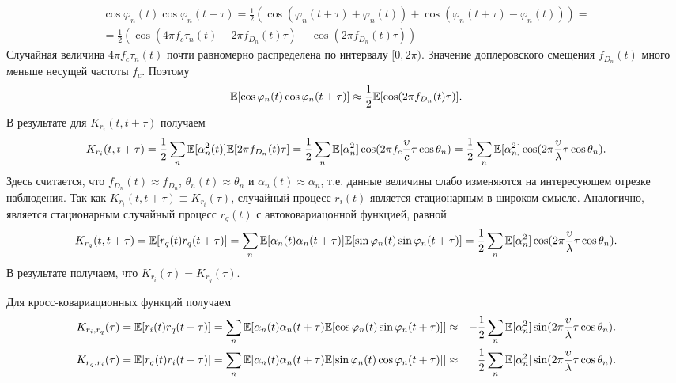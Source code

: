 \documentclass{book}
\numberwithin{theorem}{chapter}
\numberwithin{statement}{chapter}
\numberwithin{lemma}{chapter}
\theoremstyle{definition}
\numberwithin{task}{chapter}
\theoremstyle{remark}
\numberwithin{example}{chapter}
\theoremstyle{definition}
\numberwithin{definition}{chapter}
\theoremstyle{remark}
\theoremstyle{remark}
\numberwithin{lyrics}{section}
\begin{document}
\begin{gather*}
\cos \varphi_n(t) \cos \varphi_n(t + \tau) = \frac{1}{2}(\cos(\varphi_n(t + \tau) + \varphi_n(t)) 
+ \cos(\varphi_n(t + \tau) - \varphi_n(t))) = \\ = \frac{1}{2}(\cos(4 \pi f_c \tau_n(t) - 2\pi f_{D_n}(t) \tau) + \cos(2\pi f_{D_n}(t) \tau)) 
\end{gather*}
Случайная величина $4\pi f_c \tau_n(t)$ почти равномерно распределена по интервалу $[0, 2\pi)$. Значение доплеровского смещения $f_{D_n}(t) $ много меньше несущей частоты $f_c$. Поэтому 
\begin{equation*}
\mathbb{E}[\cos \varphi_n(t) \cos \varphi_n(t + \tau)] \approx \frac{1}{2} \mathbb{E}[\cos(2\pi f_{D_n}(t) \tau)].
\end{equation*}
В результате для $K_{r_i}(t, t + \tau)$ получаем
\begin{gather}
\label{eq:channel:narrow:eq2}
K_{r_i}(t, t + \tau) = \frac{1}{2}\sum\limits_n \mathbb{E}[\alpha_n^2(t)] \mathbb{E}[2\pi f_{D_n}(t) \tau] = \frac{1}{2}\sum\limits_n \mathbb{E}[\alpha_n^2] \cos (2\pi f_c \frac{\upsilon}{c} \tau \cos \theta_n) = \frac{1}{2}\sum\limits_n \mathbb{E}[\alpha_n^2] \cos (2\pi \frac{\upsilon}{\lambda} \tau \cos \theta_n).
\end{gather}
Здесь считается, что $f_{D_n}(t) \approx f_{D_n}$, $\theta_n(t) \approx \theta_n$ и $\alpha_n(t) \approx \alpha_n$, т.е. данные величины слабо изменяются на интересующем отрезке наблюдения. Так как $K_{r_i}(t, t + \tau) \equiv K_{r_i}(\tau)$, случайный процесс $r_i(t)$
является стационарным в широком смысле. Аналогично, является стационарным случайный процесс $r_q(t)$ с автоковариацонной функцией, равной
\begin{gather*}
K_{r_q}(t, t + \tau) = \mathbb{E}[r_q(t) r_q(t + \tau)] = \sum\limits_n \mathbb{E}[\alpha_n(t)\alpha_n(t + \tau)] \mathbb{E}[\sin \varphi_n(t) \sin \varphi_n(t + \tau)] = \frac{1}{2}\sum\limits_n \mathbb{E}[\alpha_n^2] \cos (2\pi \frac{\upsilon}{\lambda} \tau \cos \theta_n).
\end{gather*}
В результате получаем, что $K_{r_i}(\tau) = K_{r_q}(\tau)$.

Для кросс-ковариационных функций получаем
\begin{align}
\label{eq:channel:narrow:eq3}
K_{r_i, r_q}(\tau) = \mathbb{E}[r_i(t) r_q(t + \tau)] & = \sum\limits_n \mathbb{E}[\alpha_n(t) \alpha_n(t + \tau) \mathbb{E}[\cos \varphi_n(t) \sin \varphi_n(t + \tau)]] \approx & -\frac{1}{2} \sum\limits_n \mathbb{E}[\alpha_n^2] \sin(2\pi \frac{\upsilon}{\lambda}\tau \cos \theta_n). \\
K_{r_q, r_i}(\tau) = \mathbb{E}[r_q(t) r_i(t + \tau)] & =  \sum\limits_n \mathbb{E}[\alpha_n(t) \alpha_n(t + \tau) \mathbb{E}[\sin \varphi_n(t) \cos \varphi_n(t + \tau)]] \approx & \frac{1}{2} \sum\limits_n \mathbb{E}[\alpha_n^2] \sin(2\pi \frac{\upsilon}{\lambda}\tau \cos \theta_n). 
\end{align}
\end{document}
